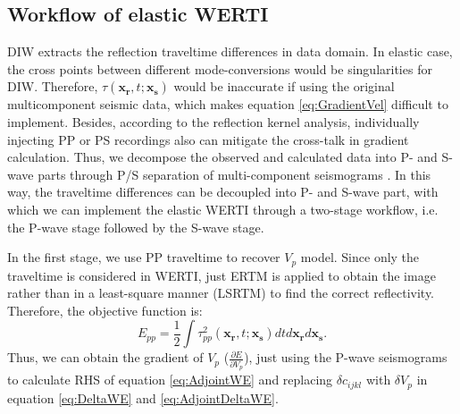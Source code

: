 \subsection{Workflow of elastic WERTI}
DIW extracts the reflection traveltime differences in data domain. In elastic case, %
the cross points between different mode-conversions would be singularities for DIW.
Therefore, $\tau(\mathbf{x_r},t;\mathbf{x_s})$ would be inaccurate if using the
original multicomponent seismic data, which makes equation \eqref{eq:GradientVel} difficult to implement.
Besides, according to the reflection kernel analysis, individually injecting PP or PS recordings also 
can mitigate the cross-talk in gradient calculation. 
Thus, we decompose the observed and calculated data into P- and S-wave
parts through P/S separation  of multi-component seismograms \cite[]{Li2016a}.
In this way, the traveltime differences can be decoupled into P- and
S-wave part, with which we can implement the elastic WERTI through a two-stage
workflow, i.e. the P-wave stage followed by the S-wave stage.

In the first stage, we use PP traveltime to recover $V_p$ model. 
Since only the traveltime is considered in WERTI, 
just ERTM is applied to obtain the image rather than in a least-square manner (LSRTM) to find the correct reflectivity. 
Therefore, the objective function is:
\begin{equation}
	E_{pp}=\frac{1}{2}\int\tau^2_{pp}(\mathbf{x_r},t;\mathbf{x_s})dtd\mathbf{x_r}d\mathbf{x_s}.
    \label{eq:ObjectivefunctionPP} 
\end{equation}
Thus, we can obtain the gradient of  $V_p$ ($\frac{\partial E}{\partial
V_p}$), just using the P-wave seismograms to
calculate RHS of equation \eqref{eq:AdjointWE} and replacing $\delta c_{ijkl}$ with
$\delta V_p$ in equation \eqref{eq:DeltaWE} and \eqref{eq:AdjointDeltaWE}.

